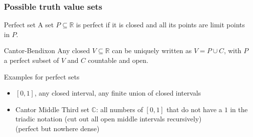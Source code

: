 \documentclass[aspectratio=169]%
  {beamer}
\newcommand{\bbR}{\mathbb{R}}
\newcommand{\bbC}{\mathbb{C}}
\begin{document}
\begin{frame}
  \frametitle{Possible truth value sets}

  \begin{block}{Perfect set}
    A set $P\subseteq \bbR$ is perfect if it is closed and all its
    points are limit points in $P$.
  \end{block}

  \begin{block}{Cantor-Bendixon}
    Any closed $V\subseteq \bbR$ can be uniquely written as $V = P\cup
    C$, with $P$ a perfect subset of $V$ and $C$ countable and open.
  \end{block}

  \pause
  \begin{block}{Examples for perfect sets}
  \begin{itemize}
  \item $[0,1]$, any closed interval, any finite union of closed
    intervals

    \medskip
  \item Cantor Middle Third set $\bbC$: all numbers of $[0,1]$ that do
    not have a $1$ in the triadic notation (cut out all open middle
    intervals recursively)\\
    (perfect but nowhere dense)
  \end{itemize}
\end{block}
\end{frame}



\end{document}
